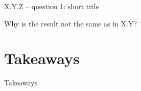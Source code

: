\documentclass[aspectratio=169,11pt]{beamer}
\begin{document}
\begin{frame}{X.Y.Z -- question 1: short title}
\Answer
\end{frame}

\begin{frame}{Why is the result not the same as in X.Y?}
\end{frame}

\section{Takeaways}

\begin{frame}{Takeaways}\small
\end{frame}
\end{document}
